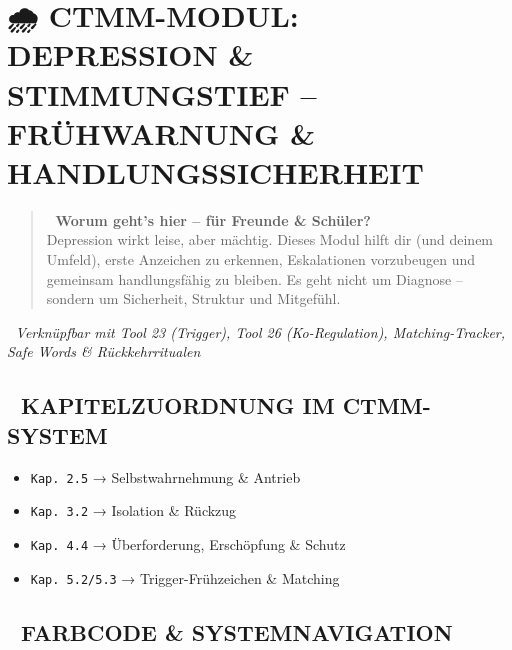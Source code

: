 %


\hypertarget{ctmm-modul-depression-stimmungstief-fruxfchwarnung-handlungssicherheit}{%
\section{🌧️ CTMM-MODUL: DEPRESSION \& STIMMUNGSTIEF -- FRÜHWARNUNG \& HANDLUNGSSICHERHEIT}\label{ctmm-modul-depression-stimmungstief-fruxfchwarnung-handlungssicherheit}}

\begin{quote}
🧠 \textbf{Worum geht's hier -- für Freunde \& Schüler?}\\
Depression wirkt leise, aber mächtig. Dieses Modul hilft dir (und deinem Umfeld), erste Anzeichen zu erkennen, Eskalationen vorzubeugen und gemeinsam handlungsfähig zu bleiben. Es geht nicht um Diagnose -- sondern um Sicherheit, Struktur und Mitgefühl.
\end{quote}

🧩 \emph{Verknüpfbar mit Tool 23 (Trigger), Tool 26 (Ko-Regulation), Matching-Tracker, Safe Words \& Rückkehrritualen}

\hypertarget{kapitelzuordnung-im-ctmm-system}{%
\subsection{📘 KAPITELZUORDNUNG IM CTMM-SYSTEM}\label{kapitelzuordnung-im-ctmm-system}}

\begin{itemize}
\tightlist
\item
  \texttt{Kap.\ 2.5} → Selbstwahrnehmung \& Antrieb
\item
  \texttt{Kap.\ 3.2} → Isolation \& Rückzug
\item
  \texttt{Kap.\ 4.4} → Überforderung, Erschöpfung \& Schutz
\item
  \texttt{Kap.\ 5.2/5.3} → Trigger-Frühzeichen \& Matching
\end{itemize}

\hypertarget{farbcode-systemnavigation}{%
\subsection{🎨 FARBCODE \& SYSTEMNAVIGATION}\label{farbcode-systemnavigation}}

